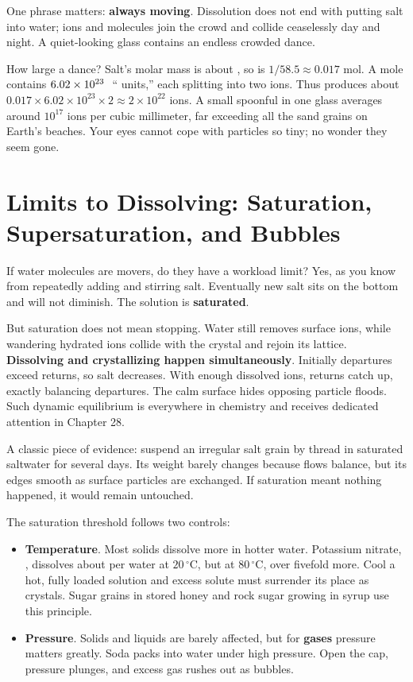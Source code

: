 One phrase matters: \textbf{always moving}. Dissolution does not end with putting salt into water; ions and molecules join the crowd and collide ceaselessly day and night. A quiet-looking glass contains an endless crowded dance.

How large a dance? Salt's molar mass is about , so  is $1/58.5\approx 0.017$ mol. A mole contains $6.02\times 10^{23}\ \mathrm{}$ `` units,'' each splitting into two ions. Thus  produces about $0.017\times 6.02\times 10^{23}\times 2\approx 2\times 10^{22}$ ions. A small spoonful in one glass averages around $10^{17}$ ions per cubic millimeter, far exceeding all the sand grains on Earth's beaches. Your eyes cannot cope with particles so tiny; no wonder they seem gone.

\section{Limits to Dissolving: Saturation, Supersaturation, and Bubbles}

If water molecules are movers, do they have a workload limit? Yes, as you know from repeatedly adding and stirring salt. Eventually new salt sits on the bottom and will not diminish. The solution is \textbf{saturated}.

But saturation does not mean stopping. Water still removes surface ions, while wandering hydrated ions collide with the crystal and rejoin its lattice. \textbf{Dissolving and crystallizing happen simultaneously}. Initially departures exceed returns, so salt decreases. With enough dissolved ions, returns catch up, exactly balancing departures. The calm surface hides opposing particle floods. Such dynamic equilibrium is everywhere in chemistry and receives dedicated attention in Chapter 28.

A classic piece of evidence: suspend an irregular salt grain by thread in saturated saltwater for several days. Its weight barely changes because flows balance, but its edges smooth as surface particles are exchanged. If saturation meant nothing happened, it would remain untouched.

The saturation threshold follows two controls:

\begin{itemize}[itemsep=2pt]
\item \textbf{Temperature}. Most solids dissolve more in hotter water. Potassium nitrate, , dissolves about  per  water at $20\,^{\circ}\mathrm{C}$, but  at $80\,^{\circ}\mathrm{C}$, over fivefold more. Cool a hot, fully loaded solution and excess solute must surrender its place as crystals. Sugar grains in stored honey and rock sugar growing in syrup use this principle.
\item \textbf{Pressure}. Solids and liquids are barely affected, but for \textbf{gases} pressure matters greatly. Soda packs  into water under high pressure. Open the cap, pressure plunges, and excess gas rushes out as bubbles.
\end{itemize}

